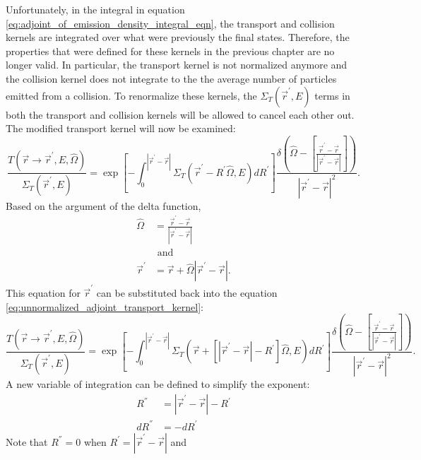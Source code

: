 Unfortunately, in the integral in equation 
\ref{eq:adjoint_of_emission_density_integral_eqn}, the transport and collision 
kernels are integrated over what were previously the final states. Therefore,
the properties that were defined for these kernels in the previous chapter are 
no longer valid. In particular, the transport kernel is not normalized anymore
and the collision kernel does not integrate to the the average number of 
particles emitted from a collision. To renormalize these kernels, the 
$\Sigma_T(\vec{r}^{'},E)$ terms in both the transport and collision kernels will
be allowed to cancel each other out. The modified transport kernel will now be 
examined:
\begin{equation}
  \frac{T(\vec{r} \to \vec{r}^{'},E,\hat{\Omega})}{\Sigma_T(\vec{r}^{'},E)} = 
  \exp{\left[-\int_0^{|\vec{r}^{'} - \vec{r}|} 
    \Sigma_T(\vec{r}^{'} - R^{'} \hat{\Omega},E)dR^{'} \right]}
  \frac{\delta \left(\hat{\Omega} - \left[\frac{\vec{r}^{'} - \vec{r}}
      {|\vec{r}^{'} - \vec{r}|}\right]\right)}
       {|\vec{r}^{'} - \vec{r}|^2}.
  \label{eq:unnormalized_adjoint_transport_kernel}
\end{equation}
Based on the argument of the delta function, 
\begin{align}
  \hat{\Omega} & = \frac{\vec{r}^{'} - \vec{r}}{|\vec{r}^{'} - \vec{r}|} 
  \nonumber \\
  & \text{ and} \nonumber \\
  \vec{r}^{'} & = \vec{r} + \hat{\Omega}|\vec{r}^{'} - \vec{r}|.
\end{align}
This equation for $\vec{r}^{'}$ can be substituted back into the equation
\ref{eq:unnormalized_adjoint_transport_kernel}:
\begin{equation*}
  \frac{T(\vec{r} \to \vec{r}^{'},E,\hat{\Omega})}{\Sigma_T(\vec{r}^{'},E)} = 
  \exp{\left[-\int_0^{|\vec{r}^{'} - \vec{r}|} 
    \Sigma_T \left(\vec{r} + \left[|\vec{r}^{'} - \vec{r}| - R^{'} \right]
    \hat{\Omega},E \right) dR^{'} 
    \right]} \frac{\delta \left(\hat{\Omega} - \left[\frac{\vec{r}^{'} - \vec{r}}
      {|\vec{r}^{'} - \vec{r}|}\right]\right)}
       {|\vec{r}^{'} - \vec{r}|^2}.
\end{equation*}
A new variable of integration can be defined to simplify the exponent:
\begin{align}
  R^{''} & = |\vec{r}^{'} - \vec{r}| - R^{'} \\
  dR^{''} & = -dR^{'} \nonumber 
\end{align}
Note that $R^{''} = 0$ when $R^{'} = |\vec{r}^{'} - \vec{r}|$ and 
